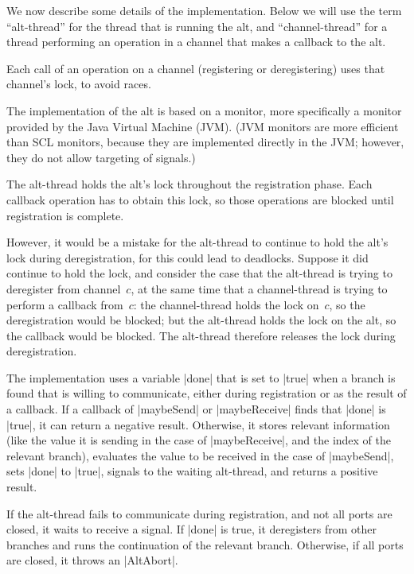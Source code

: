 We now describe some details of the implementation.  Below we will use the
term ``alt-thread'' for the thread that is running the alt, and
``channel-thread'' for a thread performing an operation in a channel that
makes a callback to the alt. 

Each call of an operation on a channel (registering or deregistering) uses that
channel's lock, to avoid races.  

The implementation of the alt is based on a monitor, more specifically a
monitor provided by the Java Virtual Machine (JVM).  (JVM monitors are more
efficient than SCL monitors, because they are implemented directly in the JVM;
however, they do not allow targeting of signals.)  

The alt-thread holds the alt's lock throughout the registration phase.  Each
callback operation has to obtain this lock, so those operations are blocked
until registration is complete. 

However, it would be a mistake for the alt-thread to continue to hold the
alt's lock during deregistration, for this could lead to deadlocks.  Suppose
it did continue to hold the lock, and consider the case that the alt-thread is
trying to deregister from channel~$c$, at the same time that a channel-thread
is trying to perform a callback from~$c$: the channel-thread holds the lock
on~$c$, so the deregistration would be blocked; but the alt-thread holds the
lock on the alt, so the callback would be blocked.  The alt-thread therefore
releases the lock during deregistration. 

The implementation uses a variable |done| that is set to |true| when a
branch is found that is willing to communicate, either during registration or
as the result of a callback.  If a callback of |maybeSend| or |maybeReceive|
finds that |done| is |true|, it can return a negative result.  Otherwise, it
stores relevant information (like the value it is sending in the case of
|maybeReceive|, and the index of the relevant branch), evaluates the value to
be received in the case of |maybeSend|, sets |done| to |true|, signals to the
waiting alt-thread, and returns a positive result.

If the alt-thread fails to communicate during registration, and not all
ports are closed, it waits to receive a signal.  If |done| is true, it
deregisters from other branches and runs the continuation of the relevant
branch.  Otherwise, if all ports are closed, it throws an |AltAbort|. 


